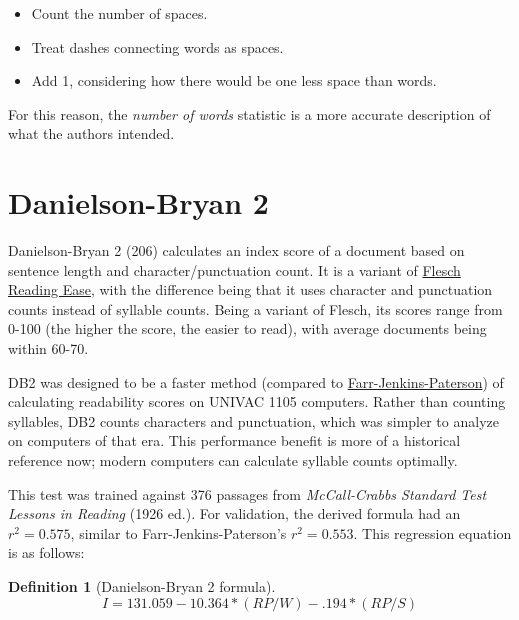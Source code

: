 \documentclass[
]{book}
\providecommand{\tightlist}{%
  \setlength{\itemsep}{0pt}\setlength{\parskip}{0pt}}
\theoremstyle{definition}
\newtheorem{definition}{Definition}[chapter]
\theoremstyle{definition}
\theoremstyle{definition}
\theoremstyle{definition}
\theoremstyle{remark}
\begin{document}
\begin{itemize}
\tightlist
\item
  Count the number of spaces.
\item
  Treat dashes connecting words as spaces.
\item
  Add 1, considering how there would be one less space than words.
\end{itemize}

For this reason, the \emph{number of words} statistic is a more accurate description of what the authors intended.

\newpage

\hypertarget{danielson-bryan-2}{%
\section{\texorpdfstring{Danielson-Bryan 2}{Danielson-Bryan 2}}\label{danielson-bryan-2}}

Danielson-Bryan 2 (206) calculates an index score of a document based on sentence length and character/punctuation count. It is a variant of \protect\hyperlink{flesch-test}{Flesch Reading Ease}, with the difference being that it uses character and punctuation counts instead of syllable counts. Being a variant of Flesch, its scores range from 0-100 (the higher the score, the easier to read), with average documents being within 60-70.

DB2 was designed to be a faster method (compared to \protect\hyperlink{farr-jenkins-paterson}{Farr-Jenkins-Paterson}) of calculating readability scores on UNIVAC 1105 computers. Rather than counting syllables, DB2 counts characters and punctuation, which was simpler to analyze on computers of that era. This performance benefit is more of a historical reference now; modern computers can calculate syllable counts optimally.

This test was trained against 376 passages from \emph{McCall-Crabbs Standard Test Lessons in Reading} (1926 ed.). For validation, the derived formula had an \(r^2 = 0.575\), similar to Farr-Jenkins-Paterson's \(r^2 = 0.553\). This regression equation is as follows:

\begin{definition}[Danielson-Bryan 2 formula]
\protect\hypertarget{def:db2}{}{\label{def:db2} {} }\[
I = 131.059 - 10.364*(RP/W) - .194*(RP/S)
\]
\end{definition}
\end{document}
